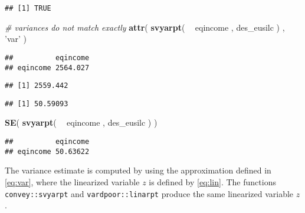 \documentclass[]{book}
\newenvironment{Shaded}{\begin{snugshade}}{\end{snugshade}}
\newcommand{\CommentTok}[1]{\textcolor[rgb]{0.56,0.35,0.01}{\textit{#1}}}
\newcommand{\KeywordTok}[1]{\textcolor[rgb]{0.13,0.29,0.53}{\textbf{#1}}}
\newcommand{\NormalTok}[1]{#1}
\newcommand{\OperatorTok}[1]{\textcolor[rgb]{0.81,0.36,0.00}{\textbf{#1}}}
\newcommand{\StringTok}[1]{\textcolor[rgb]{0.31,0.60,0.02}{#1}}
\begin{document}
\begin{verbatim}
## [1] TRUE
\end{verbatim}

\begin{Shaded}
\begin{Highlighting}[]
\CommentTok{# variances do not match exactly}
\KeywordTok{attr}\NormalTok{( }\KeywordTok{svyarpt}\NormalTok{( }\OperatorTok{~}\StringTok{ }\NormalTok{eqincome , des_eusilc ) , }\StringTok{'var'}\NormalTok{ )}
\end{Highlighting}
\end{Shaded}

\begin{verbatim}
##          eqincome
## eqincome 2564.027
\end{verbatim}

\begin{Shaded}
\end{Shaded}

\begin{verbatim}
## [1] 2559.442
\end{verbatim}

\begin{Shaded}
\end{Shaded}

\begin{verbatim}
## [1] 50.59093
\end{verbatim}

\begin{Shaded}
\begin{Highlighting}[]
\KeywordTok{SE}\NormalTok{( }\KeywordTok{svyarpt}\NormalTok{( }\OperatorTok{~}\StringTok{ }\NormalTok{eqincome , des_eusilc ) )}
\end{Highlighting}
\end{Shaded}

\begin{verbatim}
##          eqincome
## eqincome 50.63622
\end{verbatim}

The variance estimate is computed by using the approximation defined in \eqref{eq:var}, where the linearized variable \(z\) is defined by \eqref{eq:lin}. The functions \texttt{convey::svyarpt} and \texttt{vardpoor::linarpt} produce the same linearized variable \(z\).
\end{document}
